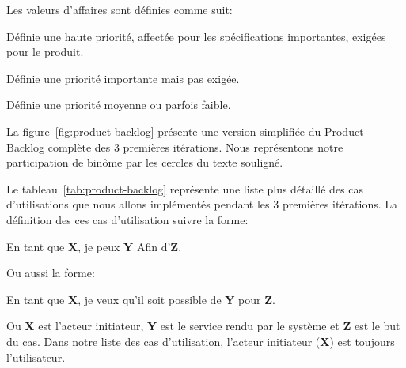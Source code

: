 Les valeurs d'affaires sont définies comme suit:

\begin{description}[align=right,labelwidth=1cm]
    \item [1:] Définie une haute priorité, affectée pour les spécifications
        importantes, exigées pour le produit.
    \item [2:] Définie une priorité importante mais pas exigée.
    \item [3:] Définie une priorité moyenne ou parfois faible.
\end{description}

La figure~\ref{fig:product-backlog} présente une version simplifiée du Product
Backlog complète des 3 premières itérations. Nous représentons notre
participation de binôme par les cercles du texte souligné.



Le tableau~\ref{tab:product-backlog} représente une liste plus détaillé des cas
d'utilisations que nous allons implémentés pendant les 3 premières itérations.
La définition des ces cas d'utilisation suivre la forme:

\begin{displayquote}
    En tant que \textbf{X}, je peux \textbf{Y} Afin d'\textbf{Z}.
\end{displayquote}

Ou aussi la forme:

\begin{displayquote}
    En tant que \textbf{X}, je veux qu'il soit possible de \textbf{Y} pour
    \textbf{Z}.
\end{displayquote}

Ou \textbf{X} est l'acteur initiateur, \textbf{Y} est le service rendu par le
système et \textbf{Z} est le but du cas. Dans notre liste des cas
d'utilisation, l'acteur initiateur (\textbf{X}) est toujours l'utilisateur.

